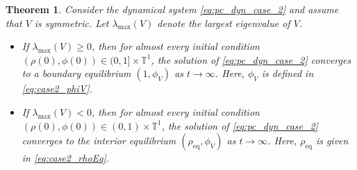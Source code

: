 \documentclass[10pt]{article}
\newtheorem{theorem}{Theorem}[section]
\theoremstyle{definition}
\theoremstyle{definition}
\numberwithin{equation}{section}
\newcommand{\BBT}{\mathbb{T}}
\newcommand{\CS}{\mathcal{S}}
\newcommand{\lambdaMax}{\lambda_{\mathrm{max}}}
\newcommand{\lambdaMin}{\lambda_{\mathrm{min}}}
\newcommand{\deltaV}{\delta_{\mathrm{V}}}
\newcommand{\eq}{\mathrm{eq}}
\newcommand{\phiV}{\phi_{V}}
\begin{document}
\begin{theorem}\label{thm:case_2}
Consider the dynamical system \eqref{eq:pc_dyn_case_2} and assume that $V$ is symmetric.
Let $\lambdaMax(V)$ denote the largest eigenvalue of $V$.
\begin{itemize}
    \item[1.] If $\lambdaMax (V) \geq 0$, then for almost every initial condition $(\rho(0), \phi(0)) \in (0,1] \times \BBT^1$, the solution of \eqref{eq:pc_dyn_case_2} converges to a boundary equilibrium $(1, \phiV)$ as $t \rightarrow \infty$.
    Here, $\phiV$ is defined in \eqref{eq:case2_phiV}.

    \item[2.] If $\lambdaMax(V) < 0$, then for almost every initial condition $(\rho(0), \phi(0)) \in (0,1) \times \BBT^1$, the solution of \eqref{eq:pc_dyn_case_2} converges to the interior equilibrium $(\rho_{\eq}, \phiV)$ as $t \rightarrow \infty$. 
    Here, $\rho_{\eq}$ is given in \eqref{eq:case2_rhoEq}.
\end{itemize}
    




\end{theorem}
\end{document}
